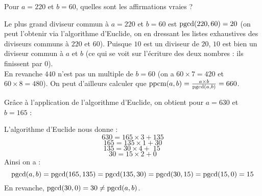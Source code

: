 \begin{question}
    Pour $a=220$ et $b=60$, quelles sont les affirmations vraies ?
    \begin{answers} 
    \end{answers}
    \begin{explanations} 
        Le plus grand diviseur commun à $a=220$ et $b=60$ est $\mathop{\text{pgcd}}(220,60) = 20$ (on peut l'obtenir via l'algorithme d'Euclide, on en dressant les listes exhaustives des diviseurs communs à $220$ et $60$). Puisque $10$ est un diviseur de $20$, $10$ est bien un diviseur commun à $a$ et $b$ (ce qui se voit sur l'écriture des deux nombres : ils finissent par $0$).\\
    En revanche $440$ n'est pas un multiple de $b=60$ (on a $60 \times 7 = 420$ et $60 \times 8 = 480$). On peut d'ailleurs calculer que $\mathop{\text{ppcm}}(a,b) = \frac{a \times b}{\mathop{\text{pgcd}}(a,b)} = 660$.
    \end{explanations}
\end{question}



\begin{question}
    Grâce à l'application de l'algorithme d'Euclide, on obtient pour $a=630$ et $b=165$ :
    \begin{answers} 
    \end{answers}
    \begin{explanations} 
     L'algorithme d'Euclide nous donne :\\
     $$ 630 = 165 \times 3 + 135 $$
     $$ 165 = 135 \times 1 + 30 $$
     $$ 135 = 30 \times 4 + \boxed{ \; 15 \; } $$
     $$ 30 = 15 \times 2 + 0 $$
     Ainsi on a :
     $$ \mathop{\text{pgcd}}(a,b) = \mathop{\text{pgcd}}(165,135) = \mathop{\text{pgcd}}(135,30) = \mathop{\text{pgcd}}(30,15) = \mathop{\text{pgcd}}(15,0) = 15 $$
     En revanche, $ \mathop{\text{pgcd}}(30,0) = 30 \neq \mathop{\text{pgcd}}(a,b)$.
    \end{explanations}
\end{question}


